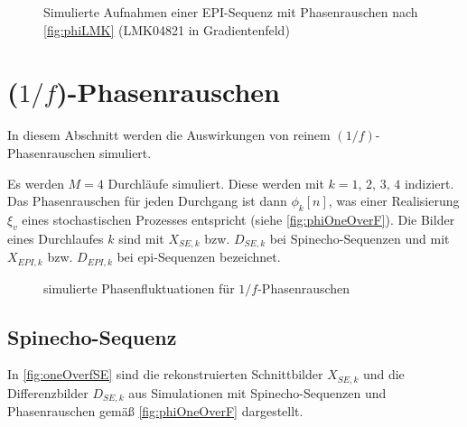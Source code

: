 \begin{figure}[H]
	\hfill
	\hfill
	\caption[LMK04821 Phasenrauschen (EPI-Sequenz)]{Simulierte Aufnahmen einer EPI-Sequenz mit Phasenrauschen nach \autoref{fig:phiLMK} (LMK04821 in Gradientenfeld)}
	\label{fig:lmkEPI}	
\end{figure}









\clearpage
\section{($1/f$)-Phasenrauschen}
In diesem Abschnitt werden die Auswirkungen von reinem $(1/f)$-Phasenrauschen simuliert.

Es werden $M=4$ Durchläufe simuliert. Diese werden mit $k=1,\,2,\,3,\,4$ indiziert. Das Phasenrauschen für jeden Durchgang ist dann $\phi_k[n]$, was einer Realisierung $\xi_v$ eines stochastischen Prozesses entspricht (siehe \autoref{fig:phiOneOverF}). Die Bilder eines Durchlaufes $k$ sind mit $X_{SE,k}$ bzw. $D_{SE,k}$ bei Spinecho-Sequenzen und mit $X_{EPI,k}$ bzw. $D_{EPI,k}$ bei \gls{epi}-Sequenzen bezeichnet.

\begin{figure}[H]
	\centering
	\caption[simulierte Phasenfluktuationen für $1/f$-Phasenrauschen]{simulierte Phasenfluktuationen für $1/f$-Phasenrauschen}
	\label{fig:phiOneOverF}
\end{figure}

\clearpage
\subsection{Spinecho-Sequenz}
In \autoref{fig:oneOverfSE} sind die rekonstruierten Schnittbilder $X_{SE,k}$ und die Differenzbilder $D_{SE,k}$ aus Simulationen mit Spinecho-Sequenzen und Phasenrauschen gemäß \autoref{fig:phiOneOverF} dargestellt.

